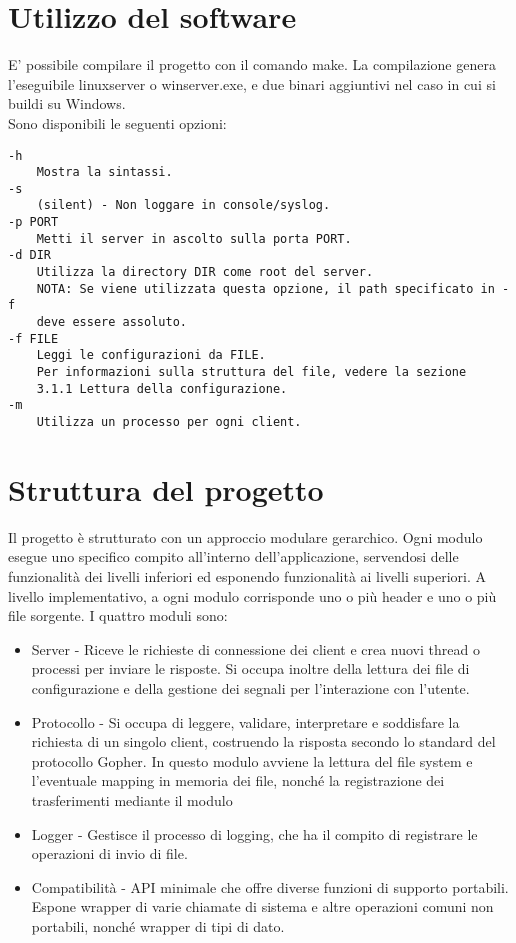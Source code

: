 \documentclass{article}
\begin{document}
\tableofcontents

\section{Utilizzo del software}

E' possibile compilare il progetto con il comando make. La compilazione genera l'eseguibile linuxserver o winserver.exe,
e due binari aggiuntivi nel caso in cui si buildi su Windows.\\
Sono disponibili le seguenti opzioni:\\
\begin{lstlisting}
-h
    Mostra la sintassi.
-s
    (silent) - Non loggare in console/syslog.
-p PORT
    Metti il server in ascolto sulla porta PORT.
-d DIR
    Utilizza la directory DIR come root del server. 
    NOTA: Se viene utilizzata questa opzione, il path specificato in -f 
    deve essere assoluto.
-f FILE 
    Leggi le configurazioni da FILE. 
    Per informazioni sulla struttura del file, vedere la sezione 
    3.1.1 Lettura della configurazione. 
-m 
    Utilizza un processo per ogni client.
\end{lstlisting}

\newpage

\section{Struttura del progetto}

Il progetto è strutturato con un approccio modulare gerarchico. 
Ogni modulo esegue uno specifico compito all'interno dell'applicazione, servendosi delle funzionalità
dei livelli inferiori ed esponendo funzionalità ai livelli superiori.
A livello implementativo, a ogni modulo corrisponde uno o più header e uno o più file sorgente.
I quattro moduli sono:
\begin{itemize}
    \item Server - Riceve le richieste di connessione dei client e crea nuovi thread 
    o processi per inviare le risposte. Si occupa inoltre della lettura dei file di configurazione e 
    della gestione dei segnali per l'interazione con l'utente.
    \item Protocollo - Si occupa di leggere, validare, interpretare e soddisfare la richiesta di un singolo client,
    costruendo la risposta secondo lo standard del protocollo Gopher. 
    In questo modulo avviene la lettura del file system e l'eventuale mapping 
    in memoria dei file, nonché la registrazione dei trasferimenti mediante il modulo
    \item Logger - Gestisce il processo di logging, che ha il compito di registrare le operazioni di invio
    di file.
    \item Compatibilità - API minimale che offre diverse funzioni di supporto portabili. Espone wrapper
    di varie chiamate di sistema e altre operazioni comuni non portabili, nonché wrapper di tipi di dato.
\end{itemize} 
\end{document}
